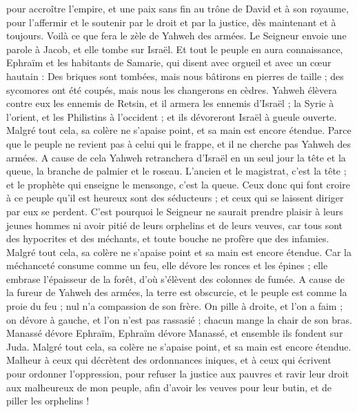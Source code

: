 \begin{multicols}{2}
pour accroître l'empire, et une paix sans fin au trône de David et à son royaume, pour l'affermir et le soutenir par le droit et par la justice, dès maintenant et à toujours. Voilà ce que fera le zèle de Yahweh des armées.
Le Seigneur envoie une parole à Jacob, et elle tombe sur Israël.
Et tout le peuple en aura connaissance, Ephraïm et les habitants de Samarie, qui disent avec orgueil et avec un cœur hautain :
Des briques sont tombées, mais nous bâtirons en pierres de taille ; des sycomores ont été coupés, mais nous les changerons en cèdres.
Yahweh élèvera contre eux les ennemis de Retsin, et il armera les ennemis d'Israël ;
la Syrie à l'orient, et les Philistins à l'occident ; et ils dévoreront Israël à gueule ouverte. Malgré tout cela, sa colère ne s'apaise point, et sa main est encore étendue.
Parce que le peuple ne revient pas à celui qui le frappe, et il ne cherche pas Yahweh des armées.
A cause de cela Yahweh retranchera d'Israël en un seul jour la tête et la queue, la branche de palmier et le roseau.
L'ancien et le magistrat, c'est la tête ; et le prophète qui enseigne le mensonge, c'est la queue.
Ceux donc qui font croire à ce peuple qu'il est heureux sont des séducteurs ; et ceux qui se laissent diriger par eux se perdent.
C'est pourquoi le Seigneur ne saurait prendre plaisir à leurs jeunes hommes ni avoir pitié de leurs orphelins et de leurs veuves, car tous sont des hypocrites et des méchants, et toute bouche ne profère que des infamies. Malgré tout cela, sa colère ne s'apaise point et sa main est encore étendue.
Car la méchanceté consume comme un feu, elle dévore les ronces et les épines ; elle embrase l'épaisseur de la forêt, d'où s'élèvent des colonnes de fumée.
A cause de la fureur de Yahweh des armées, la terre est obscurcie, et le peuple est comme la proie du feu ; nul n'a compassion de son frère.
On pille à droite, et l'on a faim ; on dévore à gauche, et l'on n'est pas rassasié ; chacun mange la chair de son bras.
Manassé dévore Ephraïm, Ephraïm dévore Manassé, et ensemble ils fondent sur Juda. Malgré tout cela, sa colère ne s'apaise point, et sa main est encore étendue.
\VerseOne{}Malheur à ceux qui décrètent des ordonnances iniques, et à ceux qui écrivent pour ordonner l'oppression,
pour refuser la justice aux pauvres et ravir leur droit aux malheureux de mon peuple, afin d'avoir les veuves pour leur butin, et de piller les orphelins !

\end{multicols}
